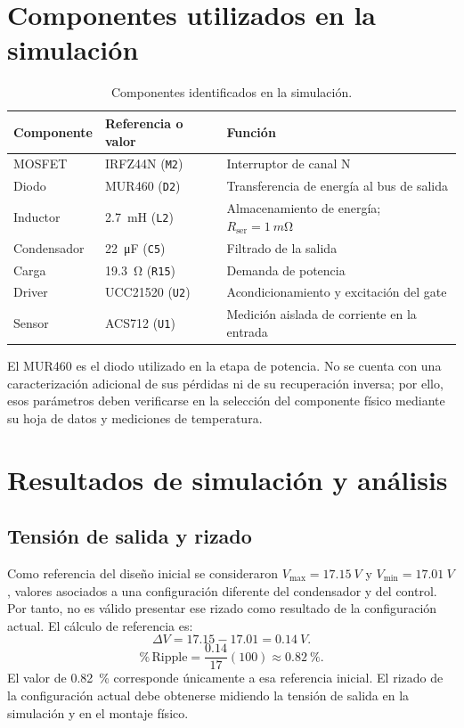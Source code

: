\documentclass[12pt]{article}
\begin{document}
\section{Componentes utilizados en la simulación}
\begin{table}[H]
\centering
\caption{Componentes identificados en la simulación.}
\label{tab:componentes}
\begin{tabular}{lll}
\toprule
\textbf{Componente} & \textbf{Referencia o valor} & \textbf{Función}\\
\midrule
MOSFET & IRFZ44N (\texttt{M2}) & Interruptor de canal N\\
Diodo & MUR460 (\texttt{D2}) & Transferencia de energía al bus de salida\\
Inductor & \SI{2.7}{mH} (\texttt{L2}) & Almacenamiento de energía; $R_{\mathrm{ser}}=\SI{1}{m\ohm}$\\
Condensador & \SI{22}{\micro F} (\texttt{C5}) & Filtrado de la salida\\
Carga & \SI{19.3}{\ohm} (\texttt{R15}) & Demanda de potencia\\
Driver & UCC21520 (\texttt{U2}) & Acondicionamiento y excitación del gate\\
Sensor & ACS712 (\texttt{U1}) & Medición aislada de corriente en la entrada\\
\bottomrule
\end{tabular}
\end{table}

El MUR460 es el diodo utilizado en la etapa de potencia. No se cuenta con una caracterización adicional de sus pérdidas ni de su recuperación inversa; por ello, esos parámetros deben verificarse en la selección del componente físico mediante su hoja de datos y mediciones de temperatura.

\section{Resultados de simulación y análisis}
\subsection{Tensión de salida y rizado}
Como referencia del diseño inicial se consideraron $V_{\max}=\SI{17.15}{V}$ y $V_{\min}=\SI{17.01}{V}$, valores asociados a una configuración diferente del condensador y del control. Por tanto, no es válido presentar ese rizado como resultado de la configuración actual. El cálculo de referencia es:
\begin{equation}
\Delta V=17.15-17.01=\SI{0.14}{V}.
\label{eq:rizado}
\end{equation}
\begin{equation}
\%\,\mathrm{Ripple}=\frac{0.14}{17}(100)\approx\SI{0.82}{\percent}.
\label{eq:porcentaje_rizado}
\end{equation}
El valor de \SI{0.82}{\percent} corresponde únicamente a esa referencia inicial. El rizado de la configuración actual debe obtenerse midiendo la tensión de salida en la simulación y en el montaje físico.
\end{document}

